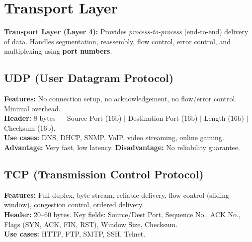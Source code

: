 \documentclass[12pt,a4paper]{article}
\begin{document}
\section{Transport Layer}

\begin{tcolorbox}[defbox]
\textbf{Transport Layer (Layer 4):} Provides \textit{process-to-process} (end-to-end) delivery of data. Handles segmentation, reassembly, flow control, error control, and multiplexing using \textbf{port numbers}.
\end{tcolorbox}

\subsection{UDP (User Datagram Protocol)}

\begin{tcolorbox}[formulabox, title={\textbf{UDP --- Connectionless, Unreliable}}]
\textbf{Features:} No connection setup, no acknowledgement, no flow/error control. Minimal overhead.\\
\textbf{Header:} 8 bytes --- Source Port (16b) $|$ Destination Port (16b) $|$ Length (16b) $|$ Checksum (16b).\\
\textbf{Use cases:} DNS, DHCP, SNMP, VoIP, video streaming, online gaming.\\
\textbf{Advantage:} Very fast, low latency. \textbf{Disadvantage:} No reliability guarantee.
\end{tcolorbox}

\subsection{TCP (Transmission Control Protocol)}

\begin{tcolorbox}[formulabox, title={\textbf{TCP --- Connection-Oriented, Reliable}}]
\textbf{Features:} Full-duplex, byte-stream, reliable delivery, flow control (sliding window), congestion control, ordered delivery.\\
\textbf{Header:} 20--60 bytes. Key fields: Source/Dest Port, Sequence No., ACK No., Flags (SYN, ACK, FIN, RST), Window Size, Checksum.\\
\textbf{Use cases:} HTTP, FTP, SMTP, SSH, Telnet.
\end{tcolorbox}
\end{document}
